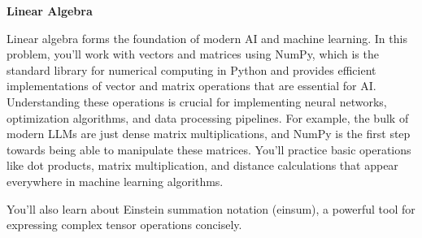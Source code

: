 \item {\bf Linear Algebra}

Linear algebra forms the foundation of modern AI and machine learning. In this problem, you'll work with vectors and matrices using NumPy, which is the standard library for numerical computing in Python and provides efficient implementations of vector and matrix operations that are essential for AI. Understanding these operations is crucial for implementing neural networks, optimization algorithms, and data processing pipelines. For example, the bulk of modern LLMs are just dense matrix multiplications, and NumPy is the first step towards being able to manipulate these matrices. You'll practice basic operations like dot products, matrix multiplication, and distance calculations that appear everywhere in machine learning algorithms.

You'll also learn about Einstein summation notation (einsum), a powerful tool for expressing complex tensor operations concisely.

\begin{enumerate}

  
  
  
  
  
  
  
  
  

\end{enumerate}
